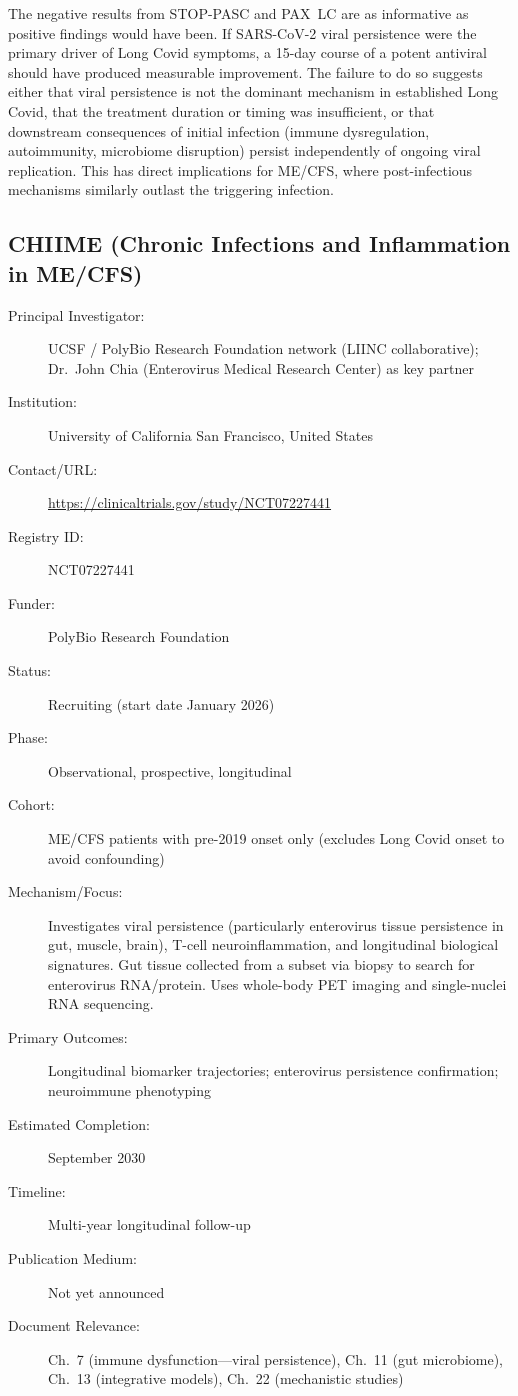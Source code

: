 The negative results from STOP-PASC and PAX~LC are as informative as positive
findings would have been.  If SARS-CoV-2 viral persistence were the primary
driver of Long Covid symptoms, a 15-day course of a potent antiviral should
have produced measurable improvement.  The failure to do so suggests either
that viral persistence is not the dominant mechanism in established Long Covid,
that the treatment duration or timing was insufficient, or that downstream
consequences of initial infection (immune dysregulation, autoimmunity,
microbiome disruption) persist independently of ongoing viral replication.
This has direct implications for ME/CFS, where post-infectious mechanisms
similarly outlast the triggering infection.

\subsection{CHIIME (Chronic Infections and Inflammation in ME/CFS)}
\label{sec:registry-chiime}

\begin{description}
    \item[Principal Investigator:] UCSF / PolyBio Research Foundation network
        (LIINC collaborative); Dr.\ John Chia (Enterovirus Medical Research
        Center) as key partner
    \item[Institution:] University of California San Francisco, United States
    \item[Contact/URL:] \url{https://clinicaltrials.gov/study/NCT07227441}
    \item[Registry ID:] NCT07227441
    \item[Funder:] PolyBio Research Foundation
    \item[Status:] Recruiting (start date January 2026)
    \item[Phase:] Observational, prospective, longitudinal
    \item[Cohort:] ME/CFS patients with pre-2019 onset only (excludes Long
        Covid onset to avoid confounding)
    \item[Mechanism/Focus:] Investigates viral persistence (particularly
        enterovirus tissue persistence in gut, muscle, brain),
        T-cell neuroinflammation, and longitudinal biological signatures.
        Gut tissue collected from a subset via biopsy to search for
        enterovirus RNA/protein.  Uses whole-body PET imaging and
        single-nuclei RNA sequencing.
    \item[Primary Outcomes:] Longitudinal biomarker trajectories; enterovirus
        persistence confirmation; neuroimmune phenotyping
    \item[Estimated Completion:] September 2030
    \item[Timeline:] Multi-year longitudinal follow-up
    \item[Publication Medium:] Not yet announced
    \item[Document Relevance:] Ch.~7 (immune dysfunction---viral persistence),
        Ch.~11 (gut microbiome), Ch.~13 (integrative models),
        Ch.~22 (mechanistic studies)
\end{description}

